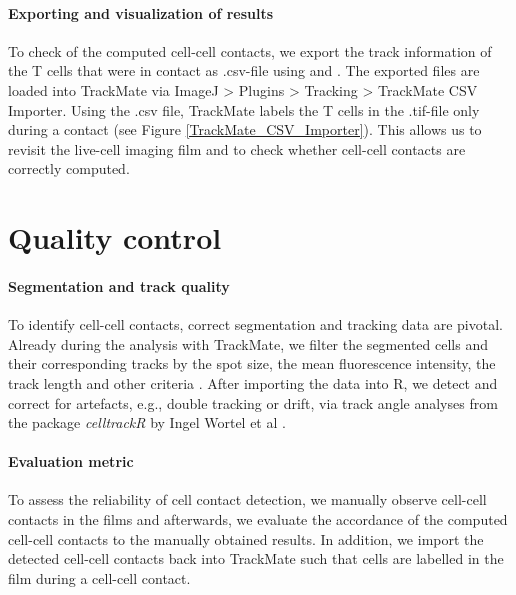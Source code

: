 \documentclass{report}
\begin{document}
\paragraph{Exporting and visualization of results}
To check of the computed cell-cell contacts, we export the track information of the T cells that were in contact as .csv-file using  and . The exported files are loaded into TrackMate via ImageJ > Plugins > Tracking > TrackMate CSV Importer. Using the .csv file, TrackMate labels the T cells in the .tif-file only during a contact (see Figure \ref{TrackMate_CSV_Importer}). This allows us to revisit the live-cell imaging film and to check whether cell-cell contacts are correctly computed.

\section{Quality control}

\paragraph{Segmentation and track quality}  To identify cell-cell contacts, correct segmentation and tracking data are pivotal. Already during the analysis with TrackMate, we filter the segmented cells and their corresponding tracks by the spot size, the mean fluorescence intensity, the track length and other criteria \citep{RN293}. After importing the data into R, we detect and correct for artefacts, e.g.,  double tracking or drift, via track angle analyses from the package \textit{celltrackR} by Ingel Wortel et al \citep{RN299}. 

\paragraph{Evaluation metric}
To assess the reliability of cell contact detection, we manually observe cell-cell contacts in the films and afterwards, we evaluate the accordance of the computed cell-cell contacts to the manually obtained results.
In addition, we import the detected cell-cell contacts back into TrackMate such that cells are labelled in the film during a cell-cell contact.


\renewcommand{\bibname}{References}

\end{document}
